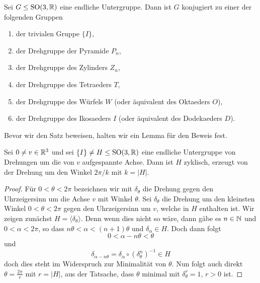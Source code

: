 \documentclass{book}
\begin{document}
\begin{thm}
    \label{thm:klass3d} Sei $G \le \operatorname{SO}(3,\mathbb{R})$ eine endliche Untergruppe. Dann ist $G$ konjugiert zu einer der folgenden Gruppen
    \begin{enumerate}[label=(\alph*)]
        \item\label{klass:1} der trivialen Gruppe $\{I\}$, 
        \item\label{klass:2} der Drehgruppe der Pyramide $P_n$,
        \item\label{klass:3} der Drehgruppe des Zylinders $Z_n$,
        \item\label{klass:4} der Drehgruppe des Tetraeders $T$,
        \item\label{klass:5} der Drehgruppe des Würfels $W$ (oder äquivalent des Oktaeders $O$),
        \item\label{klass:6} der Drehgruppe des Ikosaeders $I$ (oder äquivalent des Dodekaeders $D$).
    \end{enumerate}
\end{thm}

Bevor wir den Satz beweisen, halten wir ein Lemma für den Beweis fest. 

\begin{lem}
    \label{lem:rotcyc}
    Sei $0 \neq v \in \mathbb{R}^3$ und sei $\{I\} \neq H \le \operatorname{SO}(3,\mathbb{R})$ eine endliche
    Untergruppe von Drehungen um die von $v$ aufgespannte Achse. Dann ist $H$
    zyklisch, erzeugt von der Drehung um den Winkel $2 \pi / k$ mit $k = |H|$. 
\end{lem}
\begin{proof}
    Für $0 < \theta < 2 \pi$ bezeichnen wir mit $\delta_{\theta}$ die Drehung
    gegen den Uhrzeigersinn um die Achse $v$ mit Winkel $\theta$. 
    Sei $\delta_{\theta}$ die Drehung um den kleinsten Winkel $0 < \theta < 2 \pi$ gegen den 
    Uhrzeigersinn um $v$, welche in $H$ enthalten ist. Wir zeigen zunächst $H =
    \langle \delta_{\theta} \rangle$. Denn wenn dies nicht so wäre, dann gäbe es $n \in
    \mathbb{N}$ und $0 < \alpha < 2 \pi$, so dass $n \theta < \alpha < (n+1) \theta$
    und $\delta_{\alpha} \in H$. Doch dann folgt
    \[
        0 < \alpha - n \theta < \theta
    \]
    und 
    \[
        \delta_{\alpha - n \theta} = \delta_{\alpha} \circ (\delta_{\theta}^n)^{-1} \in H
    \]
    doch dies steht im Widerspruch zur Minimalität von $\theta$. Nun folgt auch
    direkt $\theta = \frac{2 \pi}{r}$ mit $r = |H|$, aus der Tatsache, dass $\theta$ minimal
    mit $\delta_{\theta}^r = 1$, $r > 0$ ist.  
\end{proof}
\end{document}
